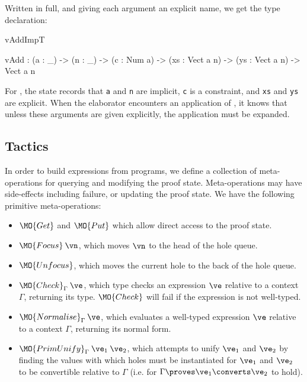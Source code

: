 \noindent
Written in full, and giving each argument an explicit name, we get the
type declaration:

\begin{SaveVerbatim}{vAddImpT}

vAdd : (a : _) -> (n : _) -> (c : Num a) -> 
       (xs : Vect a n) -> (ys : Vect a n) -> Vect a n

\end{SaveVerbatim}

\noindent
For , the state records that \texttt{a} and \texttt{n} are implicit, 
\texttt{c} is a constraint, and \texttt{xs} and \texttt{ys} are explicit. When
the elaborator encounters an application of , it knows that unless these arguments
are given explicitly, the application must be expanded.

\newcommand{\Check}{\MO{Check}_\Gamma}
\newcommand{\Eval}{\MO{Normalise}_\Gamma}
\newcommand{\Unify}{\MO{Unify}_\Gamma}
\newcommand{\PrimUnify}{\MO{PrimUnify}_\Gamma}

\subsection{Tactics}

In order to build \TT{} expressions from \Idris{} programs, we define a collection
of meta-operations for querying and modifying the proof state. Meta-operations
may have side-effects including failure, or updating the proof state. We have the following
primitive meta-operations:

\begin{itemize}
\item $\MO{Get}$ and $\MO{Put}$ which allow direct access to the proof state.
\item $\MO{Focus}\:\vn$, which moves $\vn$ to the head of the hole queue.
\item $\MO{Unfocus}$, which moves the current hole to the back of the hole queue.
\item $\Check\:\ve$, which type checks an expression $\ve$ relative to a context
$\Gamma$, returning its type.
$\MO{Check}$ will fail
if the expression is not well-typed.
\item $\Eval\:\ve$, which evaluates a well-typed expression $\ve$ relative to a context 
$\Gamma$, returning its normal form.
\item 
$\PrimUnify\:\ve_1\:\ve_2$, 
which attempts to unify $\ve_1$ and $\ve_2$ by finding the values with which
holes must be instantiated for $\ve_1$ and $\ve_2$ to be convertible relative
to $\Gamma$ (i.e. for $\Gamma\proves\ve_1\converts\ve_2$ to hold).
\end{itemize}

